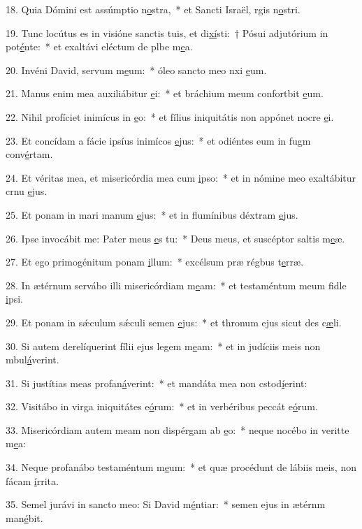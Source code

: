 18. Quia Dómini est assúmptio n\uline{o}stra,~* et Sancti Israël, rgis n\uline{o}stri.\par 
19. Tunc locútus es in visióne sanctis tuis, et di\uline{xí}sti:~† Pósui adjutórium in pot\uline{é}nte:~* et exaltávi eléctum de plbe m\uline{e}a.\par 
20. Invéni David, servum m\uline{e}um:~* óleo sancto meo nxi \uline{e}um.\par 
21. Manus enim mea auxiliábitur \uline{e}i:~* et bráchium meum confortbit \uline{e}um.\par 
22. Nihil profíciet inimícus in \uline{e}o:~* et fílius iniquitátis non appónet nocre \uline{e}i.\par 
23. Et concídam a fácie ipsíus inimícos \uline{e}jus:~* et odiéntes eum in fugm conv\uline{é}rtam.\par 
24. Et véritas mea, et misericórdia mea cum \uline{i}pso:~* et in nómine meo exaltábitur crnu \uline{e}jus.\par 
25. Et ponam in mari manum \uline{e}jus:~* et in flumínibus déxtram \uline{e}jus.\par 
26. Ipse invocábit me: Pater meus \uline{e}s tu:~* Deus meus, et suscéptor saltis m\uline{e}æ.\par 
27. Et ego primogénitum ponam \uline{i}llum:~* excélsum præ régbus t\uline{e}rræ.\par 
28. In ætérnum servábo illi misericórdiam m\uline{e}am:~* et testaméntum meum fidle \uline{i}psi.\par 
29. Et ponam in sǽculum sǽculi semen \uline{e}jus:~* et thronum ejus sicut des c\uline{æ}li.\par 
30. Si autem derelíquerint fílii ejus legem m\uline{e}am:~* et in judíciis meis non mbul\uline{á}verint.\par 
31. Si justítias meas profan\uline{á}verint:~* et mandáta mea non cstod\uline{í}erint:\par 
32. Visitábo in virga iniquitátes e\uline{ó}rum:~* et in verbéribus peccát e\uline{ó}rum.\par 
33. Misericórdiam autem meam non dispérgam ab \uline{e}o:~* neque nocébo in veritte m\uline{e}a:\par 
34. Neque profanábo testaméntum m\uline{e}um:~* et quæ procédunt de lábiis meis, non fácam \uline{í}rrita.\par 
35. Semel jurávi in sancto meo: Si David m\uline{é}ntiar:~* semen ejus in ætérnm man\uline{é}bit.\par 
